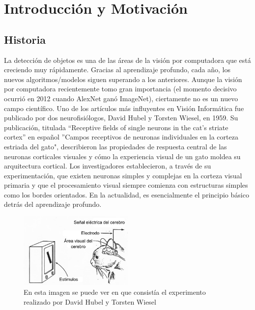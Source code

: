 \chapter{Introducción y Motivación}

\section{Historia}
La detección de objetos es una de las áreas de la visión por computadora que está creciendo muy rápidamente. Gracias al aprendizaje profundo, cada año, los nuevos algoritmos/modelos siguen superando a los anteriores. Aunque la visión por computadora recientemente tomo gran importancia (el momento decisivo ocurrió en 2012 cuando AlexNet ganó ImageNet), ciertamente no es un nuevo campo científico. Uno de los artículos más influyentes en Visión Informática fue publicado por dos neurofisiólogos, David Hubel y Torsten Wiesel, en 1959. Su publicación, titulada “Receptive fields of single neurons in the cat’s striate cortex” en español ”Campos receptivos de neuronas individuales en la corteza estriada del gato", describieron las propiedades de respuesta central de las neuronas corticales visuales y cómo la experiencia visual de un gato moldea su arquitectura cortical. Los investigadores establecieron, a través de su experimentación, que existen neuronas simples y complejas en la corteza visual primaria y que el procesamiento visual siempre comienza con estructuras simples como los bordes orientados. En la actualidad, es esencialmente el principio básico detrás del aprendizaje profundo.\\
\begin{figure}
	\centering
	\includegraphics[width=0.5\textwidth]{img/cat.jpg}
	\caption{En esta imagen se puede ver en que consistía el experimento realizado por David Hubel y Torsten Wiesel}
	\label{fig:ExpermentoHubelTorsten}
\end{figure}
